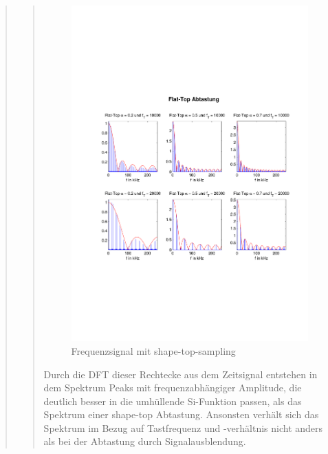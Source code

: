 \begin{quote}
\begin{quote}
  	    \begin{figure}[H]
    \centering
        \includegraphics[scale=0.6, trim = 1.5cm 6cm 1cm 8cm,
        clip]{./Bilder/flat-top-freq_5V}
            \caption{Frequenzsignal mit shape-top-sampling}
  	    \end{figure}
  	    
  	    
  	    Durch die DFT dieser Rechtecke aus dem Zeitsignal entstehen in dem
  	    Spektrum Peaks mit frequenzabhängiger Amplitude, die deutlich
  	    besser in die umhüllende Si-Funktion passen, als das Spektrum einer
  	    shape-top Abtastung. Ansonsten verhält sich das Spektrum im Bezug auf
  	    Tastfrequenz und -verhältnis nicht anders als bei der Abtastung durch
  	    Signalausblendung.
        
    \end{quote}  %


\end{quote}%

